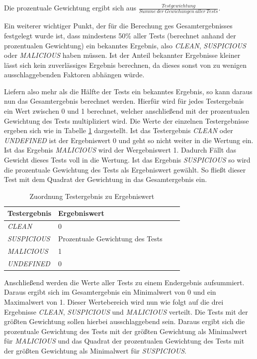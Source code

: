 Die prozentuale Gewichtung ergibt sich aus $\frac{Testgewichtung}{Summe~der~Gewichungen~aller~Tests}$.

Ein weiterer wichtiger Punkt, der für die Berechung ges Gesamtergebnisses festgelegt wurde ist, dass mindestens 50\% aller Tests (berechnet anhand der prozentualen Gewichtung) ein bekanntes Ergebnis, also \textit{CLEAN}, \textit{SUSPICIOUS} oder \textit{MALICIOUS} haben müssen. Ist der Anteil bekannter Ergebnisse kleiner lässt sich kein zuverlässiges Ergebnis berechnen, da dieses sonst von zu wenigen ausschlaggebenden Faktoren abhängen würde.

Liefern also mehr als die Hälfte der Tests ein bekanntes Ergebnis, so kann daraus nun das Gesamtergebnis berechnet werden. Hierfür wird für jedes Testergebnis ein Wert zwischen 0 und 1 berechnet, welcher anschließend mit der prozentualen Gewichtung des Tests multipliziert wird. Die Werte der einzelnen Testergebnisse ergeben sich wie in Tabelle \ref{tbl:test-values} dargestellt. Ist das Testergebnis \textit{CLEAN} oder \textit{UNDEFINED} ist der Ergebniswert 0 und geht so nicht weiter in die Wertung ein. Ist das Ergebnis \textit{MALICIOUS} wird der Wergebniswert 1. Dadurch Fällt das Gewicht dieses Tests voll in die Wertung. Ist das Ergebnis \textit{SUSPICIOUS} so wird die prozentuale Gewichtung des Tests als Ergebniswert gewählt. So fließt dieser Test mit dem Quadrat der Gewichtung in das Gesamtergebnis ein.

\begin{table}[H]
\centering
\begin{tabular}{|l|l|l|l|}
\hline
\textbf{Testergebnis} & \textbf{Ergebniswert}\\\hline
\textit{CLEAN} & 0\\\hline
\textit{SUSPICIOUS} & Prozentuale Gewichtung des Tests\\\hline
\textit{MALICIOUS} & 1\\\hline
\textit{UNDEFINED} & 0\\\hline
\end{tabular}
\caption{Zuordnung Testergebnis zu Ergebniswert}
\label{tbl:test-values}
\end{table}

Anschließend werden die Werte aller Tests zu einem Endergebnis aufsummiert. Daraus ergibt sich im Gesamtergebnis ein Minimalwert von 0 und ein Maximalwert von 1. Dieser Wertebereich wird nun wie folgt auf die drei Ergebnisse \textit{CLEAN}, \textit{SUSPICIOUS} und \textit{MALICIOUS} verteilt. Die Tests mit der größten Gewichtung sollen hierbei ausschlaggebend sein. Daraus ergibt sich die prozentuale Gewichtung des Tests mit der größten Gewichtung als Minimalwert für \textit{MALICIOUS} und das Quadrat der prozentualen Gewichtung des Tests mit der größten Gewichtung als Minimalwert für \textit{SUSPICIOUS}.

